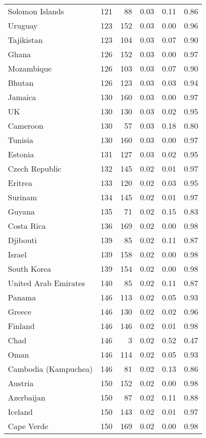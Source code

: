 \begin{longtable}[t]{lrrrrr}
\addlinespace
Solomon Islands & 121 & 88 & 0.03 & 0.11 & 0.86\\
Uruguay & 123 & 152 & 0.03 & 0.00 & 0.96\\
Tajikistan & 123 & 104 & 0.03 & 0.07 & 0.90\\
Ghana & 126 & 152 & 0.03 & 0.00 & 0.97\\
Mozambique & 126 & 103 & 0.03 & 0.07 & 0.90\\
\addlinespace
Bhutan & 126 & 123 & 0.03 & 0.03 & 0.94\\
Jamaica & 130 & 160 & 0.03 & 0.00 & 0.97\\
UK & 130 & 130 & 0.03 & 0.02 & 0.95\\
Cameroon & 130 & 57 & 0.03 & 0.18 & 0.80\\
Tunisia & 130 & 160 & 0.03 & 0.00 & 0.97\\
\addlinespace
Estonia & 131 & 127 & 0.03 & 0.02 & 0.95\\
Czech Republic & 132 & 145 & 0.02 & 0.01 & 0.97\\
Eritrea & 133 & 120 & 0.02 & 0.03 & 0.95\\
Surinam & 134 & 145 & 0.02 & 0.01 & 0.97\\
Guyana & 135 & 71 & 0.02 & 0.15 & 0.83\\
\addlinespace
Costa Rica & 136 & 169 & 0.02 & 0.00 & 0.98\\
Djibouti & 139 & 85 & 0.02 & 0.11 & 0.87\\
Israel & 139 & 158 & 0.02 & 0.00 & 0.98\\
South Korea & 139 & 154 & 0.02 & 0.00 & 0.98\\
United Arab Emirates & 140 & 85 & 0.02 & 0.11 & 0.87\\
\addlinespace
Panama & 146 & 113 & 0.02 & 0.05 & 0.93\\
Greece & 146 & 130 & 0.02 & 0.02 & 0.96\\
Finland & 146 & 146 & 0.02 & 0.01 & 0.98\\
Chad & 146 & 3 & 0.02 & 0.52 & 0.47\\
Oman & 146 & 114 & 0.02 & 0.05 & 0.93\\
\addlinespace
Cambodia (Kampuchea) & 146 & 81 & 0.02 & 0.13 & 0.86\\
Austria & 150 & 152 & 0.02 & 0.00 & 0.98\\
Azerbaijan & 150 & 87 & 0.02 & 0.11 & 0.88\\
Iceland & 150 & 143 & 0.02 & 0.01 & 0.97\\
Cape Verde & 150 & 169 & 0.02 & 0.00 & 0.98\\

\end{longtable}
